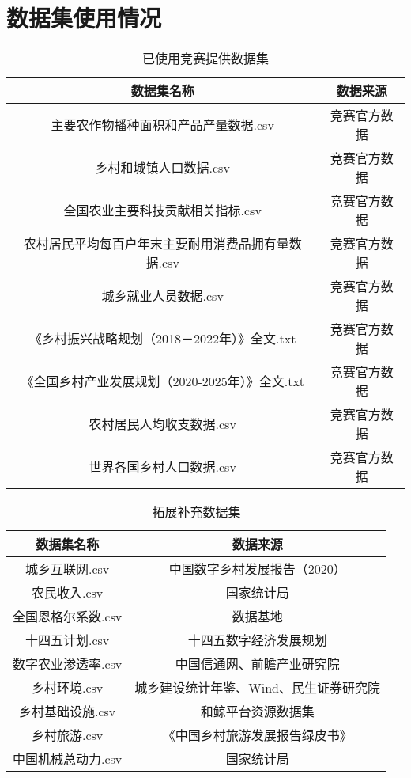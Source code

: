 \chapter{数据集使用情况}
\label{chapter:dataset}

\begin{table}[H]
\caption{已使用竞赛提供数据集}
\centering
\begin{tabular}{cc}
\hline
\hline
\textbf{数据集名称} &\textbf{数据来源}\\
\hline
主要农作物播种面积和产品产量数据.csv & 竞赛官方数据\\
乡村和城镇人口数据.csv & 竞赛官方数据 \\
全国农业主要科技贡献相关指标.csv & 竞赛官方数据\\
农村居民平均每百户年末主要耐用消费品拥有量数据.csv & 竞赛官方数据\\
城乡就业人员数据.csv & 竞赛官方数据\\
《乡村振兴战略规划（2018－2022年）》全文.txt & 竞赛官方数据\\
《全国乡村产业发展规划（2020-2025年）》全文.txt & 竞赛官方数据\\
农村居民人均收支数据.csv & 竞赛官方数据\\  世界各国乡村人口数据.csv & 竞赛官方数据\\
\hline
\end{tabular}
\end{table}

\begin{table}[H]
\caption{拓展补充数据集}
\centering
\begin{tabular}{cc}
\hline
\hline
\textbf{数据集名称} &\textbf{数据来源}\\
\hline
城乡互联网.csv & 中国数字乡村发展报告（2020）\\
农民收入.csv & 国家统计局\\
全国恩格尔系数.csv & 数据基地\\
十四五计划.csv & 十四五数字经济发展规划\\
数字农业渗透率.csv & 中国信通网、前瞻产业研究院\\
乡村环境.csv & 城乡建设统计年鉴、Wind、民生证券研究院\\
乡村基础设施.csv & 和鲸平台资源数据集\\
乡村旅游.csv & 《中国乡村旅游发展报告绿皮书》\\
中国机械总动力.csv & 国家统计局\\
\hline
\end{tabular}
\end{table}
